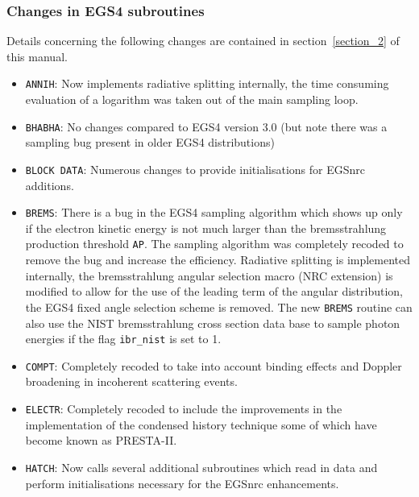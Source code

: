 \subsubsection{Changes in EGS4 subroutines}

Details concerning the following changes are contained in
section~\ref{section_2} of this manual.

\begin{itemize}
\item
{\tt ANNIH}: Now implements radiative splitting internally, 
the time consuming evaluation of a logarithm 
was taken out of the main sampling loop.

\item
{\tt BHABHA}: No changes compared to EGS4 version 3.0 
(but note there was a sampling bug present in older 
EGS4 distributions\cite{Bi96b})

\item
{\tt BLOCK DATA}: Numerous changes to provide initialisations for EGSnrc
additions.  

\item
{\tt BREMS}: There is a bug in the EGS4 sampling algorithm which shows
up only if the electron kinetic energy is not much larger than the
bremsstrahlung production threshold {\tt AP}. The sampling algorithm
was completely recoded to remove the bug and increase the efficiency.
Radiative splitting is implemented internally, the bremsstrahlung angular
selection macro (NRC extension) is modified to allow for the use of the
leading term of the angular distribution, the EGS4 fixed angle selection
scheme is removed.  The new {\tt BREMS} routine can also use the NIST
bremsstrahlung cross section data base to sample photon energies if the
flag {\tt ibr\_nist} is set to 1.


\item
{\tt COMPT}: Completely recoded to take into account binding 
effects and Doppler broadening in incoherent scattering events.
\item
{\tt ELECTR}: Completely recoded to include the 
improvements in the implementation of the condensed history 
technique some of which have become known as PRESTA-II. 
\item
{\tt HATCH}: Now calls several additional subroutines 
which read in data and perform initialisations necessary 
for the EGSnrc enhancements.


\end{itemize}
